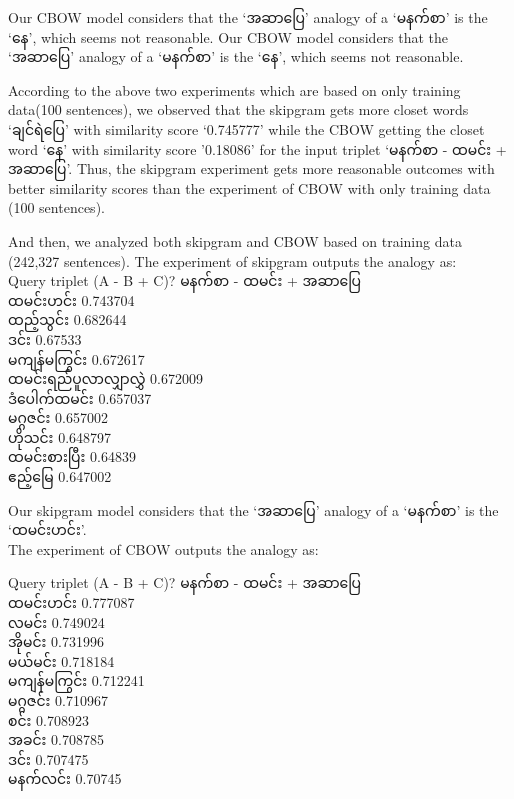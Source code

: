 \documentclass[conference]{IEEEtran}
\begin{document}
Our CBOW model considers that the `{\padauktext အဆာပြေ}' analogy of a `{\padauktext မနက်စာ}' is the `{\padauktext နေ}', which seems not reasonable. 
Our CBOW model considers that the `{\padauktext အဆာပြေ}' analogy of a `{\padauktext မနက်စာ}' is the `{\padauktext နေ}', which seems not reasonable. 

According to the above two experiments which are based on only training data(100 sentences), we observed that the skipgram gets more closet words `{\padauktext ချင်ရဲပြေ}' with similarity score `0.745777' while the CBOW getting the closet word `{\padauktext နေ}' with similarity score '0.18086' for the input triplet `{\padauktext မနက်စာ - ထမင်း + အဆာပြေ}'. Thus, the skipgram experiment gets more reasonable outcomes with better similarity scores than the experiment of CBOW with only training data (100 sentences).

And then, we analyzed both skipgram and CBOW based on training data (242,327 sentences). The experiment of skipgram outputs the analogy as:\\

\begingroup
Query triplet (A - B + C)? {\padauktext မနက်စာ - ထမင်း + အဆာပြေ }\\
{\padauktext ထမင်းဟင်း} 0.743704\\
{\padauktext ထည့်သွင်း} 0.682644\\
{\padauktext ဒင်း} 0.67533\\
{\padauktext မကျန်မကြွင်း} 0.672617\\
{\padauktext ထမင်းရည်ပူလာလျှာလွှဲ} 0.672009\\
{\padauktext ဒံပေါက်ထမင်း} 0.657037\\
{\padauktext မဂ္ဂဇင်း} 0.657002\\
{\padauktext ဟိုသင်း} 0.648797\\
{\padauktext ထမင်းစားပြီး} 0.64839\\
{\padauktext ဧည့်မြေ} 0.647002\\\endgroup

Our skipgram model considers that the `{\padauktext အဆာပြေ}' analogy of a `{\padauktext မနက်စာ}' is the `{\padauktext ထမင်းဟင်း}'.\\

The experiment of CBOW outputs the analogy as:

\begingroup
Query triplet (A - B + C)? {\padauktext မနက်စာ - ထမင်း + အဆာပြေ }\\
{\padauktext ထမင်းဟင်း} 0.777087\\
{\padauktext လမင်း} 0.749024\\
{\padauktext အိုမင်း} 0.731996\\
{\padauktext မယ်မင်း} 0.718184\\
{\padauktext မကျန်မကြွင်း} 0.712241\\
{\padauktext မဂ္ဂဇင်း} 0.710967\\
{\padauktext စင်း} 0.708923\\
{\padauktext အခင်း} 0.708785\\
{\padauktext ဒင်း} 0.707475\\
{\padauktext မနက်လင်း} 0.70745\\\endgroup
\end{document}

